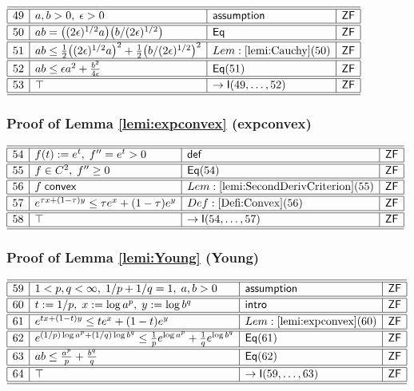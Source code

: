 \documentclass[11pt,reqno]{amsart}
\begin{document}
\noindent$%
\begin{array}{|r|l|l|l|}
\hline\hline
49 & a,b>0,\;\epsilon>0 & \mathsf{assumption} & \mathsf{ZF} \\ \hline\hline
50 & ab=\bigl((2\epsilon)^{1/2}a\bigr)\bigl(b/(2\epsilon)^{1/2}\bigr) & \mathsf{Eq} & \mathsf{ZF} \\ \hline\hline
51 & ab\le\tfrac12\bigl((2\epsilon)^{1/2}a\bigr)^{2}+\tfrac12\bigl(b/(2\epsilon)^{1/2}\bigr)^{2} & Lem:\ref{lemi:Cauchy}(50) & \mathsf{ZF} \\ \hline\hline
52 & ab\le\epsilon a^{2}+\tfrac{b^{2}}{4\epsilon} & \mathsf{Eq}(51) & \mathsf{ZF} \\ \hline\hline
53 & \top & \to\mathsf{I}(49,\dots,52) & \mathsf{ZF} \\ \hline\hline
\end{array}%
$

\medskip

\subsubsection*{Proof of Lemma \ref{lemi:expconvex} (\textsf{expconvex})}

\noindent$%
\begin{array}{|r|l|l|l|}
\hline\hline
54 & f(t):=e^{t},\;f^{\prime\prime}=e^{t}>0 & \mathsf{def} & \mathsf{ZF} \\ \hline\hline
55 & f\in C^{2},\;f^{\prime\prime}\ge0 & \mathsf{Eq}(54) & \mathsf{ZF} \\ \hline\hline
56 & f\;\mathsf{convex} & Lem:\ref{lemi:SecondDerivCriterion}(55) & \mathsf{ZF} \\ \hline\hline
57 & e^{\tau x+(1-\tau)y}\le\tau e^{x}+(1-\tau)e^{y} & Def:\ref{Defi:Convex}(56) & \mathsf{ZF} \\ \hline\hline
58 & \top & \to\mathsf{I}(54,\dots,57) & \mathsf{ZF} \\ \hline\hline
\end{array}%
$

\medskip

\subsubsection*{Proof of Lemma \ref{lemi:Young} (\textsf{Young})}

\noindent$%
\begin{array}{|r|l|l|l|}
\hline\hline
59 & 1<p,q<\infty,\;1/p+1/q=1,\;a,b>0 & \mathsf{assumption} & \mathsf{ZF} \\ \hline\hline
60 & t:=1/p,\;x:=\log a^{p},\;y:=\log b^{q} & \mathsf{intro} & \mathsf{ZF} \\ \hline\hline
61 & e^{t x+(1-t)y}\le t e^{x}+(1-t)e^{y} & Lem:\ref{lemi:expconvex}(60) & \mathsf{ZF} \\ \hline\hline
62 & e^{(1/p)\log a^{p}+(1/q)\log b^{q}}\le\tfrac1p e^{\log a^{p}}+\tfrac1q e^{\log b^{q}} & \mathsf{Eq}(61) & \mathsf{ZF} \\ \hline\hline
63 & ab\le\tfrac{a^{p}}{p}+\tfrac{b^{q}}{q} & \mathsf{Eq}(62) & \mathsf{ZF} \\ \hline\hline
64 & \top & \to\mathsf{I}(59,\dots,63) & \mathsf{ZF} \\ \hline\hline
\end{array}%
$
\end{document}
